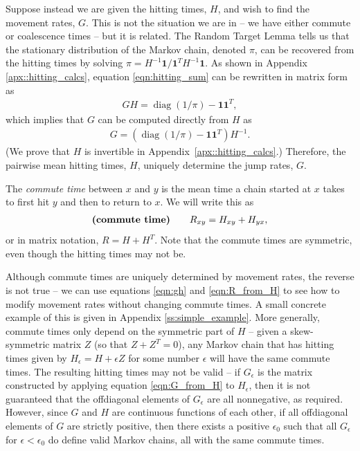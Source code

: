 \documentclass{article}
\DeclareMathOperator{\diag}{\mathop{\mbox{diag}}}
\newcommand{\bone}{\mathbf{1}}
\begin{document}
Suppose instead we are given the hitting times, $H$, and wish to find the movement rates, $G$.
This is not the situation we are in -- we have either commute or coalescence times --
but it is related.
The Random Target Lemma \citep{aldous-fill-2014}
tells us that the stationary distribution of the Markov chain, denoted $\pi$,
can be recovered from the hitting times by solving $\pi = H^{-1} \bone / \bone^T H^{-1} \bone$.
As shown in Appendix \ref{apx::hitting_calcs},
equation \eqref{eqn:hitting_sum} can be rewritten in matrix form as
\begin{align} \label{eqn:gh}
    G H = \diag(1/\pi) - \bone \bone^T ,
\end{align}
which implies that $G$ can be computed directly from $H$ as
\begin{align} \label{eqn:G_from_H}
    G = \left( \diag(1/\pi) - \bone \bone^T \right) H^{-1} .
\end{align}
(We prove that $H$ is invertible in Appendix~\ref{apx::hitting_calcs}.) 
Therefore, the pairwise mean hitting times, $H$, uniquely determine the jump rates, $G$.

The \emph{commute time} between $x$ and $y$ is the mean time a chain started at $x$ takes 
to first hit $y$ and then to return to $x$.
We will write this as
\begin{align} \label{eqn:R_from_H}
\text{\bf (commute time)} \qquad
    R_{xy} = H_{xy} + H_{yx},
\end{align}
or in matrix notation, $R = H + H^T$.
Note that the commute times are symmetric,
even though the hitting times may not be.

Although commute times are uniquely determined by movement rates, the reverse is not true --
we can use equations \eqref{eqn:gh} and \eqref{eqn:R_from_H} to see how to modify movement rates
without changing commute times.  
A small concrete example of this is given in Appendix \ref{ss:simple_example}.
More generally, commute times only depend on the symmetric part of $H$ --
given a skew-symmetric matrix $Z$ (so that $Z + Z^T = 0$),
any Markov chain that has hitting times given by $H_\epsilon = H + \epsilon Z$ for some number $\epsilon$
will have the same commute times.
The resulting hitting times may not be valid --
if $G_\epsilon$ is the matrix constructed by applying equation \eqref{eqn:G_from_H} to $H_\epsilon$,
then it is not guaranteed that the offdiagonal elements of $G_\epsilon$ are all nonnegative, as required.
However, since $G$ and $H$ are continuous functions of each other,
if all offdiagonal elements of $G$ are strictly positive,
then there exists a positive $\epsilon_0$ such that all $G_\epsilon$ for $\epsilon < \epsilon_0$
do define valid Markov chains, all with the same commute times.
\end{document}
